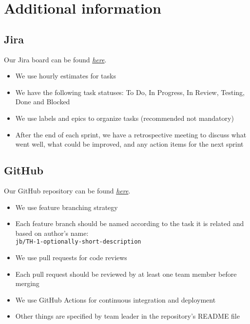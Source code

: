 \documentclass[12pt]{article}
\begin{document}
\section{Additional information}
\subsection{Jira}
Our Jira board can be found \href{https://table-hub.atlassian.net/jira/software/projects/TH/boards/1}{\textit{here}}.
\begin{itemize}
    \item We use hourly estimates for tasks
    \item We have the following task statuses: To Do, In Progress, In Review, Testing, Done and Blocked
    \item We use labels and epics to organize tasks (recommended not mandatory)
    \item After the end of each sprint, we have a retrospective meeting to discuss what went well, what could be improved, and any action items for the next sprint
\end{itemize}
\subsection{GitHub}
Our GitHub repository can be found \href{https://github.com/Table-Hub-TUL}{\textit{here}}.
\begin{itemize}
    \item We use feature branching strategy
    \item Each feature branch should be named according to the task it is related and based on author's name: \\ \texttt{jb/TH-1-optionally-short-description}
    \item We use pull requests for code reviews
    \item Each pull request should be reviewed by at least one team member before merging
    \item We use GitHub Actions for continuous integration and deployment
    \item Other things are specified by team leader in the repository's README file
\end{itemize}
\end{document}
